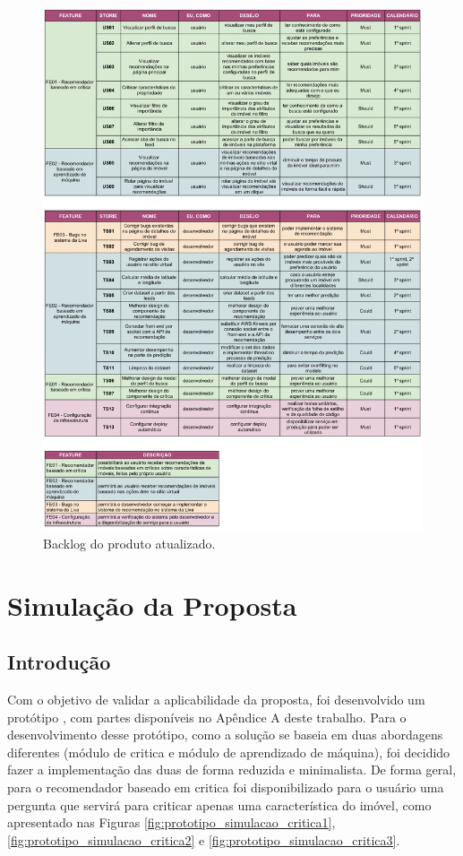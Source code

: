 \begin{apendicesenv}
\begin{figure}[H]
    \centering
    \includegraphics[scale=0.315]{figuras/desenvolvimento/Backlog.png}
    \caption[Backlog do produto atualizado]{Backlog do produto atualizado.}
    \label{fig:apendice_backlog}
\end{figure}

\chapter{Simulação da Proposta}
\label{apendiceA}

\section{Introdução}

Com o objetivo de validar a aplicabilidade da proposta, foi desenvolvido um protótipo , com partes disponíveis no Apêndice A deste trabalho. Para o desenvolvimento desse protótipo, como a solução se baseia em duas abordagens diferentes (módulo de critica e módulo de aprendizado de máquina), foi decidido fazer a implementação das duas de forma reduzida e minimalista. De forma geral, para o recomendador baseado em critica foi disponibilizado para o usuário uma pergunta que servirá para criticar apenas uma característica do imóvel, como apresentado nas Figuras \ref{fig:prototipo_simulacao_critica1}, \ref{fig:prototipo_simulacao_critica2} e \ref{fig:prototipo_simulacao_critica3}.


\end{apendicesenv}

